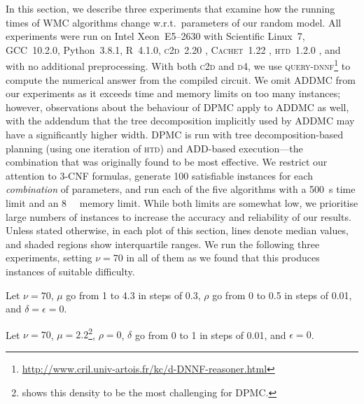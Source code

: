 In this section, we describe three experiments that examine how the running
times of WMC algorithms change w.r.t.\ parameters of our random model. All
experiments were run on Intel Xeon~E5--2630 with Scientific Linux~7, GCC~10.2.0,
Python~3.8.1, R~4.1.0, \textsc{c2d}~2.20 \citep{DBLP:conf/ecai/Darwiche04},
\textsc{Cachet}~1.22 \citep{DBLP:conf/sat/SangBBKP04}, \textsc{htd}~1.2.0
\citep{DBLP:conf/cpaior/AbseherMW17}, and with no additional preprocessing. With
both \textsc{c2d} and \textsc{d4}, we use
\textsc{query-dnnf}\footnote{\url{http://www.cril.univ-artois.fr/kc/d-DNNF-reasoner.html}}
to compute the numerical answer from the compiled circuit. We omit
\textsc{ADDMC} \citep{DBLP:conf/aaai/DudekPV20} from our experiments as it
exceeds time and memory limits on too many instances; however, observations
about the behaviour of \textsc{DPMC} \citep{DBLP:conf/cp/DudekPV20} apply to
\textsc{ADDMC} as well, with the addendum that the tree decomposition implicitly
used by \textsc{ADDMC} may have a significantly higher width. \textsc{DPMC} is
run with tree decomposition-based planning (using one iteration of \textsc{htd})
and ADD-based execution---the combination that was originally found to be most
effective. We restrict our attention to 3-CNF formulas, generate 100 satisfiable
instances for each \emph{combination} of parameters, and run each of the five
algorithms with a \SI{500}{\second} time limit and an \SI{8}{\gibi\byte} memory
limit. While both limits are somewhat low, we prioritise large numbers of
instances to increase the accuracy and reliability of our results. Unless stated
otherwise, in each plot of this section, lines denote median values, and shaded
regions show interquartile ranges. We run the following three experiments,
setting $\nu = 70$ in all of them as we found that this produces instances of
suitable difficulty.

\begin{experiment}\label{exp:density}
  Let $\nu = 70$, $\mu$ go from 1 to 4.3 in steps of 0.3, $\rho$ go from 0 to
  0.5 in steps of 0.01, and $\delta = \epsilon = 0$.
\end{experiment}

\begin{experiment}[$\delta$]\label{exp:delta}
  Let $\nu = 70$, $\mu = 2.2$\footnote{ shows this density to
    be the most challenging for \textsc{DPMC}.},
  $\rho = 0$, $\delta$ go from 0 to 1 in steps of 0.01, and $\epsilon = 0$.
\end{experiment}

